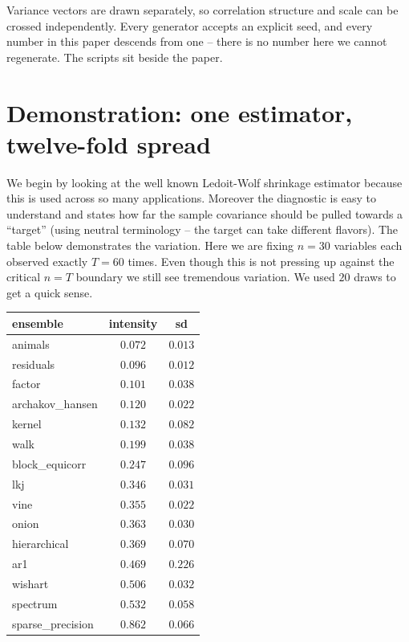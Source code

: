\documentclass[11pt]{article}
\begin{document}
Variance vectors are drawn separately, so correlation structure and scale
can be crossed independently. Every generator accepts an explicit seed,
and every number in this paper descends from one -- there is no number
here we cannot regenerate. The scripts sit beside the paper.

\section{Demonstration: one estimator, twelve-fold spread}\label{sec:lw-demo}

We begin by looking at the well known Ledoit-Wolf shrinkage estimator because this is used across so many applications. Moreover the diagnostic is easy to understand and states how far the sample covariance should be pulled towards a ``target'' (using neutral terminology -- the target can take different flavors). The table below demonstrates the variation. Here we are fixing $n=30$ variables each observed exactly $T=60$ times. Even though this is not pressing up against the critical $n=T$ boundary we still see tremendous variation. We used $20$ draws to get a quick sense.

\begin{center}\small
\begin{tabular}{lcc}
\toprule
ensemble & intensity & sd \\
\midrule
animals & $0.072$ & $0.013$ \\
residuals & $0.096$ & $0.012$ \\
factor & $0.101$ & $0.038$ \\
archakov\_hansen & $0.120$ & $0.022$ \\
kernel & $0.132$ & $0.082$ \\
walk & $0.199$ & $0.038$ \\
block\_equicorr & $0.247$ & $0.096$ \\
lkj & $0.346$ & $0.031$ \\
vine & $0.355$ & $0.022$ \\
onion & $0.363$ & $0.030$ \\
hierarchical & $0.369$ & $0.070$ \\
ar1 & $0.469$ & $0.226$ \\
wishart & $0.506$ & $0.032$ \\
spectrum & $0.532$ & $0.058$ \\
sparse\_precision & $0.862$ & $0.066$ \\
\bottomrule
\end{tabular}
\end{center}
\end{document}
